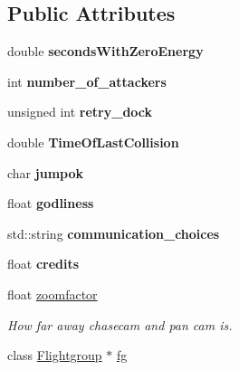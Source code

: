 \subsection*{Public Attributes}
\begin{DoxyCompactItemize}
\item 
double {\bfseries seconds\+With\+Zero\+Energy}\hypertarget{classCockpit_a0de3f3111f5148b8e192387ba252feda}{}\label{classCockpit_a0de3f3111f5148b8e192387ba252feda}

\item 
int {\bfseries number\+\_\+of\+\_\+attackers}\hypertarget{classCockpit_a11ec935b77d9fe237e2d553f117961d9}{}\label{classCockpit_a11ec935b77d9fe237e2d553f117961d9}

\item 
unsigned int {\bfseries retry\+\_\+dock}\hypertarget{classCockpit_a45cd153dafeee012d63c72edfd0ce624}{}\label{classCockpit_a45cd153dafeee012d63c72edfd0ce624}

\item 
double {\bfseries Time\+Of\+Last\+Collision}\hypertarget{classCockpit_acdb6c117f3683f0945deb7ec202e35f7}{}\label{classCockpit_acdb6c117f3683f0945deb7ec202e35f7}

\item 
char {\bfseries jumpok}\hypertarget{classCockpit_ae122921304a733c442d5d65d2f151138}{}\label{classCockpit_ae122921304a733c442d5d65d2f151138}

\item 
float {\bfseries godliness}\hypertarget{classCockpit_a269833671448067e897867abe7845792}{}\label{classCockpit_a269833671448067e897867abe7845792}

\item 
std\+::string {\bfseries communication\+\_\+choices}\hypertarget{classCockpit_a6e34a3f461dcb7155231edad361eb2bd}{}\label{classCockpit_a6e34a3f461dcb7155231edad361eb2bd}

\item 
float {\bfseries credits}\hypertarget{classCockpit_aade2c48dbd8b4c2b4aa2a7ebef0998e4}{}\label{classCockpit_aade2c48dbd8b4c2b4aa2a7ebef0998e4}

\item 
float \hyperlink{classCockpit_a19cb4a855d955d1cf2e6215c6cb3fbf2}{zoomfactor}\hypertarget{classCockpit_a19cb4a855d955d1cf2e6215c6cb3fbf2}{}\label{classCockpit_a19cb4a855d955d1cf2e6215c6cb3fbf2}

\begin{DoxyCompactList}\small\item\em How far away chasecam and pan cam is. \end{DoxyCompactList}\item 
class \hyperlink{classFlightgroup}{Flightgroup} $\ast$ \hyperlink{classCockpit_a9bb8c7dd6a52b72b61ec58db9bbfa5aa}{fg}\hypertarget{classCockpit_a9bb8c7dd6a52b72b61ec58db9bbfa5aa}{}\label{classCockpit_a9bb8c7dd6a52b72b61ec58db9bbfa5aa}


\end{DoxyCompactItemize}
